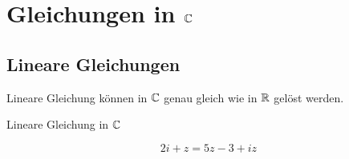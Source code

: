\section{Gleichungen in \texorpdfstring{$\mathbb{C}$}{C}}
\subsection{Lineare Gleichungen}
Lineare Gleichung können in $\mathbb{C}$ genau gleich wie in $\mathbb{R}$ gelöst werden.

\begin{bsp}
    {Lineare Gleichung in $\mathbb{C}$}{}

    $$ 2i+z = 5z -3 + iz$$

    \vspace*{7cm}
    

\end{bsp}

